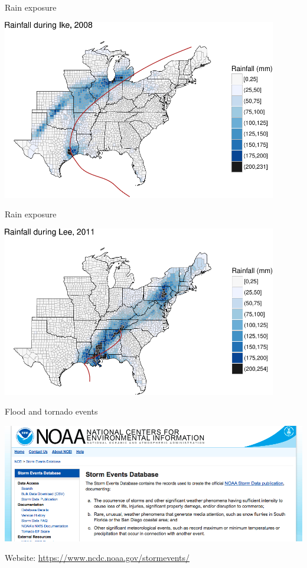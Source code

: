 \documentclass[ignorenonframetext,]{beamer}
\begin{document}
\begin{frame}{Rain exposure}

\begin{center}\includegraphics[width=0.9\textwidth]{anderson_jan11_files/figure-beamer/ike_rain_example-1} \end{center}

\end{frame}

\begin{frame}{Rain exposure}

\begin{center}\includegraphics[width=0.9\textwidth]{anderson_jan11_files/figure-beamer/lee_rain_example-1} \end{center}

\end{frame}

\begin{frame}{Flood and tornado events}

\includegraphics[width=\textwidth]{noaastormevents}

Website: \url{https://www.ncdc.noaa.gov/stormevents/}

\end{frame}
\end{document}
